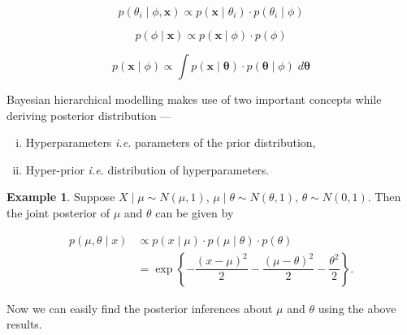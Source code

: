 \documentclass[12pt, a4paper]{article}
\theoremstyle{definition}
\newtheorem{example}{Example}
\begin{document}
$$p\left( \theta_i \mid \phi, \boldsymbol{x} \right) \propto p\left( \boldsymbol{x} \mid \theta_i \right) \cdot p\left( \theta_i \mid \phi \right)$$

$$p\left( \phi \mid \boldsymbol{x} \right) \propto p\left( \boldsymbol{x} \mid \phi \right) \cdot p\left( \phi \right)$$

$$p\left( \boldsymbol{x} \mid \phi \right) \propto \displaystyle{\int p\left( \boldsymbol{x} \mid \boldsymbol{\theta} \right) \cdot p\left( \boldsymbol{\theta} \mid \phi \right) \; d\boldsymbol{\theta}}$$

\newpage

Bayesian hierarchical modelling makes use of two important concepts while deriving posterior distribution ---

\begin{enumerate}[(i)]
\item Hyperparameters \textit{i.e.} parameters of the prior distribution,
\item Hyper-prior \textit{i.e.} distribution of hyperparameters.
\end{enumerate}

\begin{example}
Suppose $X \mid \mu \sim N\left( \mu, 1 \right)$, $\mu \mid \theta \sim N\left( \theta, 1\right)$, $\theta \sim N\left( 0, 1 \right)$. Then the joint posterior of $\mu$ and $\theta$ can be given by

\begin{align*}
p\left( \mu, \theta \mid x \right) &\propto p\left( x \mid \mu \right) \cdot p\left( \mu \mid \theta \right) \cdot p\left( \theta \right) \\[0.5em]
&= \exp\left\{ -\dfrac{\left( x - \mu \right)^2}{2} - \dfrac{\left( \mu - \theta \right)^2}{2} - \dfrac{\theta^2}{2} \right\}.
\end{align*}

Now we can easily find the posterior inferences about $\mu$ and $\theta$ using the above results.

\end{example}
\end{document}
